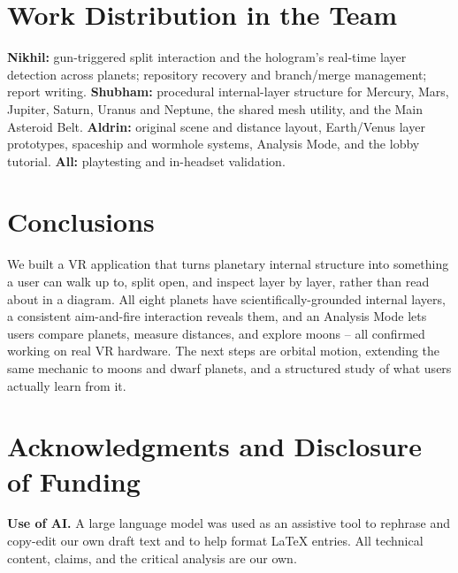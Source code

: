 \documentclass[journal]{vgtc}
\begin{document}
\section{Work Distribution in the Team}
\textbf{Nikhil:} gun-triggered split interaction and the hologram's real-time layer detection across planets; repository recovery and branch/merge management; report writing.
\textbf{Shubham:} procedural internal-layer structure for Mercury, Mars, Jupiter, Saturn, Uranus and Neptune, the shared mesh utility, and the Main Asteroid Belt.
\textbf{Aldrin:} original scene and distance layout, Earth/Venus layer prototypes, spaceship and wormhole systems, Analysis Mode, and the lobby tutorial.
\textbf{All:} playtesting and in-headset validation.

\section{Conclusions}
We built a VR application that turns planetary internal structure into something a user can walk up to, split open, and inspect layer by layer, rather than read about in a diagram. All eight planets have scientifically-grounded internal layers, a consistent aim-and-fire interaction reveals them, and an Analysis Mode lets users compare planets, measure distances, and explore moons -- all confirmed working on real VR hardware. The next steps are orbital motion, extending the same mechanic to moons and dwarf planets, and a structured study of what users actually learn from it.

\section*{Acknowledgments and Disclosure of Funding}
\textbf{Use of AI.} A large language model was used as an assistive tool to rephrase and copy-edit our own draft text and to help format LaTeX entries. All technical content, claims, and the critical analysis are our own.



\end{document}
